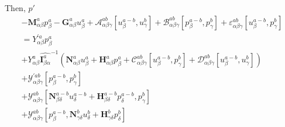 \documentclass{Note}
\begin{document}
Then, $p'$
 \begin{equation}
\begin{aligned}
-\textbf{M}_{\alpha\beta}^a p_\beta^a -\textbf{G}_{\alpha\beta}^a u_\beta^a+\mathcal{A}_{\alpha\beta\gamma}^{ab}[u_{\beta}^{a-b},u_{\gamma}^{b}]+\mathcal{B}_{\alpha\beta\gamma}^{ab}[p_{\beta}^{a-b},p_{\gamma}^{b}]+\varepsilon_{\alpha\beta\gamma}^{ab}[u_{\beta}^{a-b},p_{\gamma}^{b}]\\={Y}_{\alpha\beta}^{'a} p_{\beta}^a\\
+Y_{\alpha\beta}^{a}  {\widehat{\textbf{I}_{\beta \alpha}^a}}^{-1}  (\textbf{N}_{\alpha\beta}^a u_\beta^a+\textbf{H}_{\alpha\beta}^a p_\beta^a+\mathcal{C}_{\alpha\beta\gamma}^{ab}[u_{\beta}^{a-b},p_{\gamma}^{b}]+\mathcal{D}_{\alpha\beta\gamma}^{ab}[u_{\beta}^{a-b},u_{\gamma}^{b}])\\+\mathcal{Y}_{\alpha\beta\gamma}^{'ab}[p_{\beta}^{a-b},p_{\gamma}^{b}]\\
+\mathcal{Y}_{\alpha\beta\gamma}^{ab}[\textbf{N}_{\beta\delta}^{a-b} u_{\delta}^{a-b}+\textbf{H}_{\beta\delta}^{a-b} p_{\delta}^{a-b},p_{\gamma}^{b}]\\
+\mathcal{Y}_{\alpha\beta\gamma}^{ab}[p_\beta^{a-b},\textbf{N}_{\gamma\delta}^{b} u_{\delta}^{b}+\textbf{H}_{\gamma\delta}^{b} p_{\delta}^{b}]
\end{aligned}
\end{equation}
\end{document}
